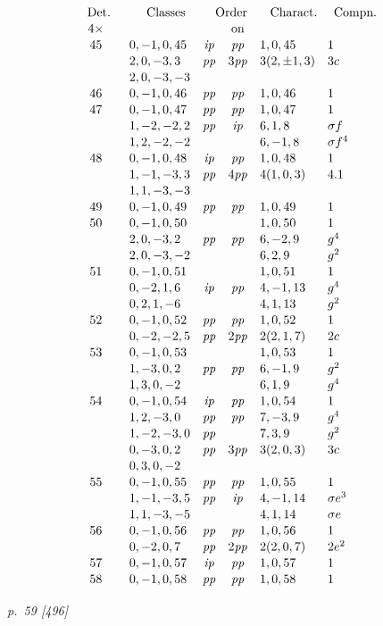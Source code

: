 ﻿\documentclass[11pt,a4paper]{article}
\theoremstyle{plain}
\theoremstyle{definition}
\newcommand{\pp}{\mathit{pp}}
\newcommand{\ip}{\mathit{ip}}
\newcommand{\sg}{\sigma}
\newcommand{\row}[7]{#1 & #2 & #3 & #4 & #5 & #6 & #7\\}
\begin{document}
\[
\renewcommand{\arraystretch}{1.08}
\begin{array}{c@{\quad}r@{\quad}l@{\quad}c@{\quad}c@{\quad}l@{\quad}l}
\multicolumn{1}{c}{\text{Det.}}&&
\multicolumn{1}{c}{\text{Classes}}&
\multicolumn{2}{c}{\text{Order}}&
\multicolumn{1}{c}{\text{Charact.}}&
\multicolumn{1}{c}{\text{Compn.}}\\
4\times&&& &\text{on}&&\\
\row{45}{}{0,-1,0,45}{\ip}{\pp}{1,0,45}{1}
\row{}{}{2,0,-3,3}{\pp}{3\pp}{3(2,\pm1,3)}{3c}
\row{}{}{2,0,-3,-3}{}{}{}{}
\row{46}{}{0,-1,0,46}{\pp}{\pp}{1,0,46}{1}
\row{47}{}{0,-1,0,47}{\pp}{\pp}{1,0,47}{1}
\row{}{}{1,-2,-2,2}{\pp}{\ip}{6,1,8}{\sg f}
\row{}{}{1,2,-2,-2}{}{}{6,-1,8}{\sg f^4}
\row{48}{}{0,-1,0,48}{\ip}{\pp}{1,0,48}{1}
\row{}{}{1,-1,-3,3}{\pp}{4\pp}{4(1,0,3)}{4.1}
\row{}{}{1,1,-3,-3}{}{}{}{}
\row{49}{}{0,-1,0,49}{\pp}{\pp}{1,0,49}{1}
\row{50}{}{0,-1,0,50}{}{}{1,0,50}{1}
\row{}{}{2,0,-3,2}{\pp}{\pp}{6,-2,9}{g^4}
\row{}{}{2,0,-3,-2}{}{}{6,2,9}{g^2}
\row{51}{}{0,-1,0,51}{}{}{1,0,51}{1}
\row{}{}{0,-2,1,6}{\ip}{\pp}{4,-1,13}{g^4}
\row{}{}{0,2,1,-6}{}{}{4,1,13}{g^2}
\row{52}{}{0,-1,0,52}{\pp}{\pp}{1,0,52}{1}
\row{}{}{0,-2,-2,5}{\pp}{2\pp}{2(2,1,7)}{2c}
\row{53}{}{0,-1,0,53}{}{}{1,0,53}{1}
\row{}{}{1,-3,0,2}{\pp}{\pp}{6,-1,9}{g^2}
\row{}{}{1,3,0,-2}{}{}{6,1,9}{g^4}
\row{54}{}{0,-1,0,54}{\ip}{\pp}{1,0,54}{1}
\row{}{}{1,2,-3,0}{\pp}{\pp}{7,-3,9}{g^4}
\row{}{}{1,-2,-3,0}{\pp}{}{7,3,9}{g^2}
\row{}{}{0,-3,0,2}{\pp}{3\pp}{3(2,0,3)}{3c}
\row{}{}{0,3,0,-2}{}{}{}{}
\row{55}{}{0,-1,0,55}{\pp}{\pp}{1,0,55}{1}
\row{}{}{1,-1,-3,5}{\pp}{\ip}{4,-1,14}{\sg e^3}
\row{}{}{1,1,-3,-5}{}{}{4,1,14}{\sg e}
\row{56}{}{0,-1,0,56}{\pp}{\pp}{1,0,56}{1}
\row{}{}{0,-2,0,7}{\pp}{2\pp}{2(2,0,7)}{2e^2}
\row{57}{}{0,-1,0,57}{\ip}{\pp}{1,0,57}{1}
\row{58}{}{0,-1,0,58}{\pp}{\pp}{1,0,58}{1}
\end{array}
\]

\clearpage
\textit{p.~59 [496]}
\end{document}

